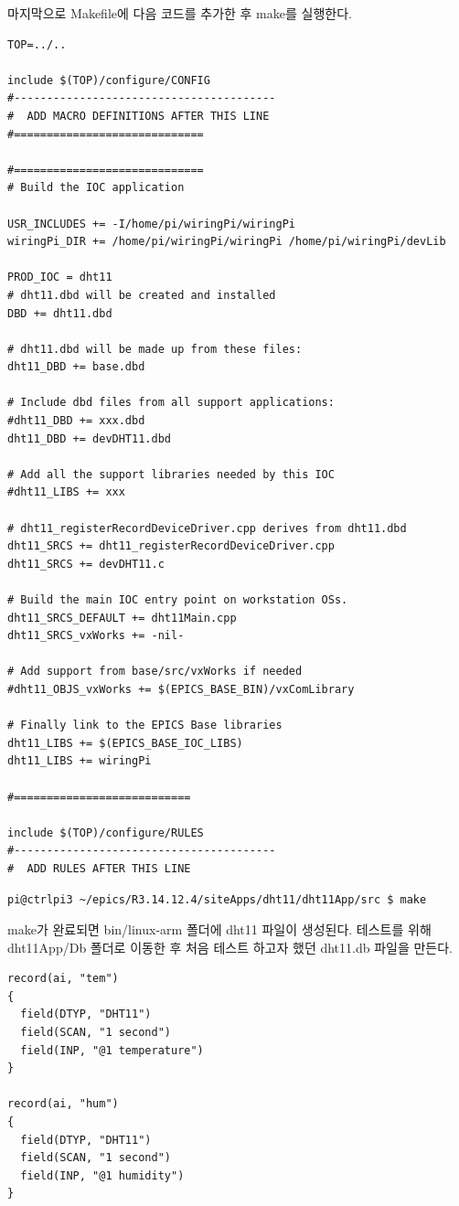 \documentclass[11pt
  , a4paper
  , article
  , oneside
]{memoir}
\begin{document}
마지막으로 Makefile에 다음 코드를 추가한 후 make를 실행한다.
\begin{lstlisting}[style=termstyle]
TOP=../..

include $(TOP)/configure/CONFIG
#----------------------------------------
#  ADD MACRO DEFINITIONS AFTER THIS LINE
#=============================

#=============================
# Build the IOC application

USR_INCLUDES += -I/home/pi/wiringPi/wiringPi
wiringPi_DIR += /home/pi/wiringPi/wiringPi /home/pi/wiringPi/devLib

PROD_IOC = dht11
# dht11.dbd will be created and installed
DBD += dht11.dbd

# dht11.dbd will be made up from these files:
dht11_DBD += base.dbd

# Include dbd files from all support applications:
#dht11_DBD += xxx.dbd
dht11_DBD += devDHT11.dbd

# Add all the support libraries needed by this IOC
#dht11_LIBS += xxx

# dht11_registerRecordDeviceDriver.cpp derives from dht11.dbd
dht11_SRCS += dht11_registerRecordDeviceDriver.cpp
dht11_SRCS += devDHT11.c

# Build the main IOC entry point on workstation OSs.
dht11_SRCS_DEFAULT += dht11Main.cpp
dht11_SRCS_vxWorks += -nil-

# Add support from base/src/vxWorks if needed
#dht11_OBJS_vxWorks += $(EPICS_BASE_BIN)/vxComLibrary

# Finally link to the EPICS Base libraries
dht11_LIBS += $(EPICS_BASE_IOC_LIBS)
dht11_LIBS += wiringPi

#===========================

include $(TOP)/configure/RULES
#----------------------------------------
#  ADD RULES AFTER THIS LINE
\end{lstlisting}
\begin{lstlisting}[style=termstyle]
pi@ctrlpi3 ~/epics/R3.14.12.4/siteApps/dht11/dht11App/src $ make
\end{lstlisting}
make가 완료되면 bin/linux-arm 폴더에 dht11 파일이 생성된다.
테스트를 위해 dht11App/Db 폴더로 이동한 후 처음 테스트 하고자 했던 dht11.db 파일을 만든다.
\begin{lstlisting}[style=termstyle]
record(ai, "tem")
{
  field(DTYP, "DHT11")
  field(SCAN, "1 second")
  field(INP, "@1 temperature")
}

record(ai, "hum")
{
  field(DTYP, "DHT11")
  field(SCAN, "1 second")
  field(INP, "@1 humidity")
}
\end{lstlisting}
\end{document}
